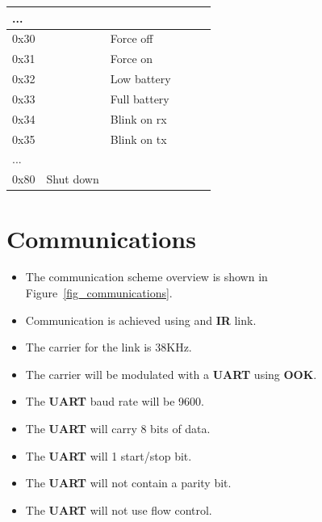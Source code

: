 \documentclass[a4paper]{article}
\begin{document}
\begin{table}[h]
\begin{tabular}{|l|l|l|l|l|l|}
               ...            &                       &                       &                    &                       &                       \\ \hline   
               0x30           &                       &  Force off            &                    &                       &                       \\ \hline   
               0x31           &                       &  Force on             &                    &                       &                       \\ \hline   
               0x32           &                       &  Low battery          &                    &                       &                       \\ \hline   
               0x33           &                       &  Full battery         &                    &                       &                       \\ \hline   
               0x34           &                       &  Blink on rx          &                    &                       &                       \\ \hline   
               0x35           &                       &  Blink on tx          &                    &                       &                       \\ \hline   
               ...            &                       &                       &                    &                       &                       \\ \hline   
               0x80           &  Shut down            &                       &                    &                       &                       \\ \hline   

         
         \end{tabular}
      \end{table}


\section{Communications}
 
\begin{itemize}
   \item The communication scheme overview is shown in Figure~\ref{fig_communications}. 
   \item Communication is achieved using and \textbf{IR} link.
   \item The carrier for the link is 38KHz.
   \item The carrier will be modulated with a \textbf{UART} using \textbf{OOK}.
   \item The \textbf{UART} baud rate will be 9600.
   \item The \textbf{UART} will carry 8 bits of data.
   \item The \textbf{UART} will 1 start/stop bit.
   \item The \textbf{UART} will not contain a parity bit.
   \item The \textbf{UART} will not use flow control.
\end{itemize}
\end{document}
